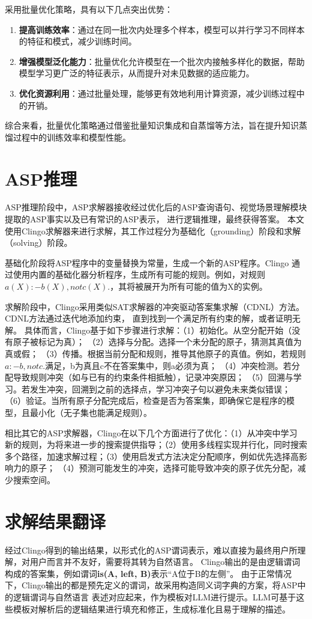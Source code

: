 采用批量优化策略，具有以下几点突出优势：
\begin{enumerate}[itemsep=0pt,parsep=0pt]
\item \textbf{提高训练效率}：​通过在同一批次内处理多个样本，模型可以并行学习不同样本的特征和模式，减少训练时间。
\item \textbf{增强模型泛化能力}：批量优化允许模型在一个批次内接触多样化的数据，帮助模型学习更广泛的特征表示，从而提升对未见数据的适应能力。
\item \textbf{优化资源利用}：通过批量处理，能够更有效地利用计算资源，减少训练过程中的开销。
\end{enumerate}

综合来看，批量优化策略通过借鉴批量知识集成和自蒸馏等方法，旨在提升知识蒸馏过程中的训练效率和模型性能。
\section{ASP推理}
ASP推理阶段中，ASP求解器接收经过优化后的ASP查询语句、视觉场景理解模块提取的ASP事实以及已有常识的ASP表示，
进行逻辑推理，最终获得答案。
本文使用Clingo求解器来进行求解，其工作过程分为基础化（grounding）阶段和求解（solving）阶段。

基础化阶段将ASP程序中的变量替换为常量，生成一个新的ASP程序。Clingo
通过使用内置的基础化器分析程序，生成所有可能的规则。例如，对规则
$a(X) :- b(X), not c(X).$，其将被展开为所有可能的值为X的实例。

求解阶段中，Clingo采用类似SAT求解器的冲突驱动答案集求解（CDNL）方法。CDNL方法通过迭代地添加约束，
直到找到一个满足所有约束的解，或者证明无解。
具体而言，Clingo基于如下步骤进行求解：（1）初始化。从空分配开始（没有原子被标记为真）；
（2）选择与分配。选择一个未分配的原子，猜测其真值为真或假；
（3）传播。根据当前分配和规则，推导其他原子的真值。例如，若规则$a :- b, not c.$满足，b为真且c不在答案集中，则a必须为真；
（4）冲突检测。若分配导致规则冲突（如与已有的约束条件相抵触），记录冲突原因；
（5）回溯与学习。若发生冲突，回溯到之前的选择点，学习冲突子句以避免未来类似错误；
（6）验证。当所有原子分配完成后，检查是否为答案集，即确保它是程序的模型，且最小化（无子集也能满足规则）。

相比其它的ASP求解器，Clingo在以下几个方面进行了优化：（1）从冲突中学习
新的规则，为将来进一步的搜索提供指导；（2）使用多线程实现并行化，同时搜索
多个路径，加速求解过程；（3）使用启发式方法决定分配顺序，例如优先选择高影响力的原子；
（4）预测可能发生的冲突，选择可能导致冲突的原子优先分配，减少搜索空间。
\section{求解结果翻译}
经过Clingo得到的输出结果，以形式化的ASP谓词表示，难以直接为最终用户所理解，对用户而言并不友好，需要将其转为自然语言。
Clingo输出的是由逻辑谓词构成的答案集，例如谓词\textbf{is(A, left, B)}表示“A位于B的左侧”。
由于正常情况下，Clingo输出的都是预先定义的谓词，故采用构造同义词字典的方案，将ASP中的逻辑谓词与自然语言
表述对应起来，作为模板对LLM进行提示。LLM可基于这些模板对解析后的逻辑结果进行填充和修正，生成标准化且易于理解的描述。

